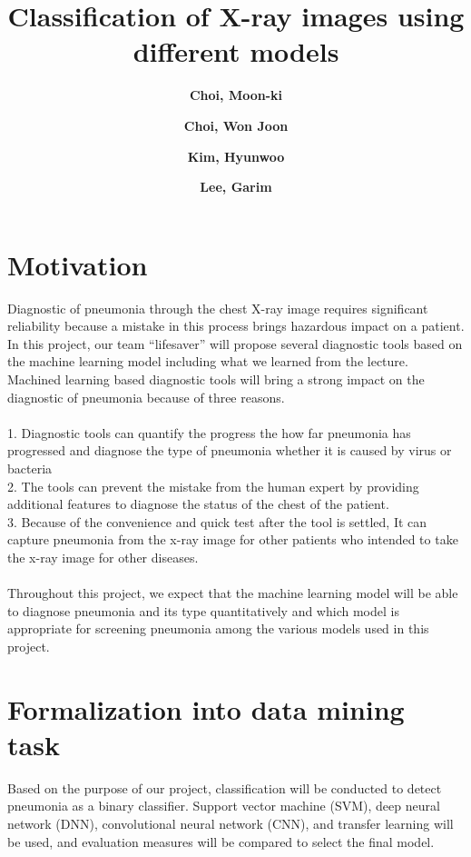 \documentclass{article}
\title{Classification of X-ray images using different models}
\author{
 \textbf{Choi, Moon-ki}\\
 \and
 \textbf{Choi, Won Joon}\\
 \and
 \textbf{Kim, Hyunwoo}\\
    \and
 \textbf{Lee, Garim}\\
}
\begin{document}
\maketitle
\section{Motivation}

Diagnostic of pneumonia through the chest X-ray image requires significant reliability because a mistake in this process brings hazardous impact on a patient. In this project, our team “lifesaver” will propose several diagnostic tools based on the machine learning model including what we learned from the lecture. Machined learning based diagnostic tools will bring a strong impact on the diagnostic of pneumonia because of three reasons.\\\\
1. Diagnostic tools can quantify the progress the how far pneumonia has progressed and diagnose the type of pneumonia whether it is caused by virus or bacteria
\vspace{2mm}
\\2. The tools can prevent the mistake from the human expert by providing additional features to diagnose the status of the chest of the patient.
\vspace{2mm}
\\3. Because of the convenience and quick test after the tool is settled, It can capture pneumonia from the x-ray image for other patients who intended to take the x-ray image for other diseases. \\\\
Throughout this project, we expect that the machine learning model will be able to diagnose pneumonia and its type quantitatively and which model is appropriate for screening pneumonia among the various models used in this project.


\section{Formalization into data mining task}
Based on the purpose of our project, classification will be conducted to detect pneumonia as a binary classifier. Support vector machine (SVM), deep neural network (DNN), convolutional neural network (CNN), and transfer learning will be used, and evaluation measures will be compared to select the final model.
\end{document}
